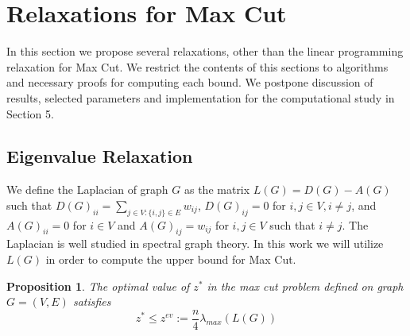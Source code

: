 \documentclass[12pt]{article}
\theoremstyle{plain}
\newtheorem{prop}{Proposition}
\theoremstyle{definition}
\begin{document}
\section{Relaxations for Max Cut}\label{sec:Relaxations}

In this section we propose several relaxations, other than the linear programming relaxation for Max Cut. We restrict the contents of this sections to algorithms and necessary proofs for computing each bound. We postpone discussion of results, selected parameters and implementation for the computational study in Section 5.

\subsection{Eigenvalue Relaxation}\label{subsec:Eigenvalue}

We define the Laplacian of graph $G$ as the matrix $L(G) = D(G) - A(G)$ such that $D(G)_{ii} = \sum_{j \in V: \lbrace i,j \rbrace \in E} w_{ij}$, $D(G)_{ij} = 0$ for $i,j \in V, i \neq j$, and $A(G)_{ii} = 0$ for $i \in V$ and $A(G)_{ij} = w_{ij}$ for $i,j \in V$ such that $i \neq j$. The Laplacian is well studied in spectral graph theory. In this work we will utilize $L(G)$ in order to compute the upper bound for Max Cut.

\begin{prop}
The optimal value of $z^*$ in the max cut problem defined on graph $G=(V,E)$ satisfies
\[
    z^* \leq z^{ev} := \dfrac{n}{4} \lambda_{max}(L(G))
\]
\end{prop}
\end{document}
